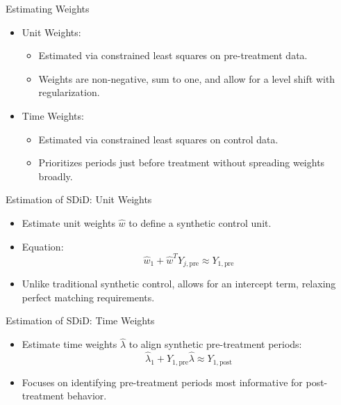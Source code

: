 \documentclass{beamer}
\begin{document}
\begin{frame}{Estimating Weights}

\begin{itemize}
    \item Unit Weights:
    \begin{itemize}
        \item Estimated via constrained least squares on pre-treatment data.
        \item Weights are non-negative, sum to one, and allow for a level shift with regularization.
    \end{itemize}
    \item Time Weights:
    \begin{itemize}
        \item Estimated via constrained least squares on control data.
        \item Prioritizes periods just before treatment without spreading weights broadly.
    \end{itemize}
\end{itemize}

\end{frame}



\begin{frame}{Estimation of SDiD: Unit Weights}

\begin{itemize}
    \item Estimate unit weights \(\widehat{w}\) to define a synthetic control unit.
    \item Equation: 
    \[
    \widehat{w}_1 + \widehat{w}^T Y_{j,\text{pre}} \approx Y_{1,\text{pre}}
    \]
    \item Unlike traditional synthetic control, allows for an intercept term, relaxing perfect matching requirements.
\end{itemize}

\end{frame}

\begin{frame}{Estimation of SDiD: Time Weights}

\begin{itemize}
    \item Estimate time weights \(\widehat{\lambda}\) to align synthetic pre-treatment periods:
    \[
    \widehat{\lambda}_1 + Y_{1,\text{pre}} \widehat{\lambda} \approx Y_{1,\text{post}}
    \]
    \item Focuses on identifying pre-treatment periods most informative for post-treatment behavior.
\end{itemize}

\end{frame}
\end{document}
